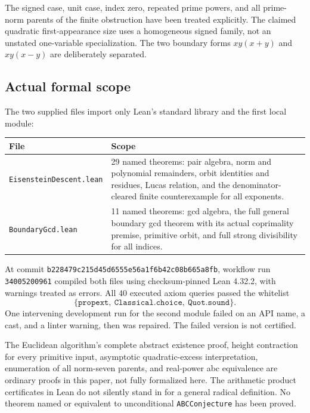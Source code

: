 The signed case, unit case, index zero, repeated prime powers, and all prime-norm parents of the finite obstruction have been treated explicitly. The claimed quadratic first-appearance size uses a homogeneous signed family, not an unstated one-variable specialization. The two boundary forms $xy(x+y)$ and $xy(x-y)$ are deliberately separated.

\subsection{Actual formal scope}
The two supplied files import only Lean's standard library and the first local module:
\begin{center}
\begin{tabular}{@{}p{}p{}@{}}
\toprule
File & Scope\\\midrule
\texttt{EisensteinDescent.lean} & 29 named theorems: pair algebra, norm and polynomial remainders, orbit identities and residues, Lucas relation, and the denominator-cleared finite counterexample for all exponents.\\[3pt]
\texttt{BoundaryGcd.lean} & 11 named theorems: gcd algebra, the full general boundary gcd theorem with its actual coprimality premise, primitive orbit, and full strong divisibility for all indices.\\\bottomrule
\end{tabular}
\end{center}
At commit \texttt{b228479c215d45d6555e56a1f6b42c08b665a8fb}, workflow run \texttt{34005200961} compiled both files using checksum-pinned Lean 4.32.2, with warnings treated as errors. All 40 executed axiom queries passed the whitelist
\[
\{\texttt{propext},\ \texttt{Classical.choice},\ \texttt{Quot.sound}\}.
\]
One intervening development run for the second module failed on an API name, a cast, and a linter warning, then was repaired. The failed version is not certified.

The Euclidean algorithm's complete abstract existence proof, height contraction for every primitive input, asymptotic quadratic-excess interpretation, enumeration of all norm-seven parents, and real-power abc equivalence are ordinary proofs in this paper, not fully formalized here. The arithmetic product certificates in Lean do not silently stand in for a general radical definition. No theorem named or equivalent to unconditional \texttt{ABCConjecture} has been proved.

